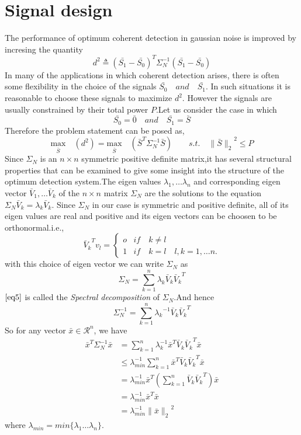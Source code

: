 \documentclass[12pt]{report}
\begin{document}
\section{Signal design}
    The performance of optimum coherent detection in gaussian noise is improved by incresing the quantity \[d^2\triangleq (\bar{S_1}-\bar{S_0})^T\varSigma_{N}^{-1}(\bar{S_1}-\bar{S_0})\]In many of the applications in which coherent detection arises, there is often some flexibility in the choice of the signals $\bar{S_0}\quad and\quad\bar{S_1}$. In such situations it is reasonable to choose these signals to maximize $d^2$. However the signals are usually constrained by their total power $P$.Let us consider the case in which\[\bar{S_0}=\bar{0}\quad and\quad\bar{S_1}=\bar{S}\] Therefore the problem statement can be posed as,
\begin{equation*}
\underset{\bar{S}}{\mathrm{max}}\quad (d^2)= \underset{\bar{S}}{\mathrm{max}}\quad (\bar{S}^T\varSigma_{N}^{-1}\bar{S})\qquad s.t.\quad {\parallel\bar{S}\parallel_2}^2\leq {P} 
\end{equation*}
Since $\varSigma_N$ is an $n\times n$ symmetric positive definite matrix,it has several structural properties that can be examined to give some insight into the structure of the optimum detection system.The eigen values $\lambda_1,\dots \lambda_n$ and corresponding eigen vector $\bar{V}_1,\dots \bar{V}_k $ of the $n\times n$ matrix $\varSigma_N$ are the solutions to the equation $\varSigma_{N}\bar{V}_k=\lambda_k\bar{V}_k $. Since $\varSigma_{N}$ in our case is symmetric and positive definite, all of its eigen values are real and positive and its eigen vectors can be choosen to be orthonormal.i.e.,
\[{\bar{V}_k}^Tv_l=\begin{cases}
o &if\quad k\neq l\\1 &if\quad k=l\quad l,k=1,\dots n.
\end{cases}\]
with this choice of eigen vector we can write $\varSigma_{N}$ as
\begin{equation}
\label{eq5}\varSigma_{N}=\sum_{k=1}^{n}\lambda_k\bar{V}_k{\bar{V}_k}^T
\end{equation}
$\eqref{eq5}$ is called the \textit{Spectral decomposition} of $\varSigma_{N}$.And hence \[\varSigma_{N}^{-1}=\sum_{k=1}^{n}{\lambda_k}^{-1}\bar{V}_k{\bar{V}_k}^T\] So for any vector $\bar{x}\in \mathcal{R}^n$, we have
\begin{align*}
	\bar{x}^T\varSigma_{N}^{-1}\bar{x}&=\sum_{k=1}^{n}\lambda_k^{-1}\bar{x}^T\bar{V}_k{\bar{V}_k}^T\bar{x}\\&\leq \lambda_{min}^{-1}\sum_{k=1}^{n}\bar{x}^T\bar{V}_k{\bar{V}_k}^T\bar{x}\\&= \lambda_{min}^{-1}\bar{x}^T(\sum_{k=1}^{n}\bar{V}_k{\bar{V}_k}^T)\bar{x}\\&= \lambda_{min}^{-1}\bar{x}^T\bar{x}\\&= \lambda_{min}^{-1}{\parallel\bar{x}\parallel_2}^2
\end{align*} where $\lambda_{min}=min\lbrace\lambda_1\dots \lambda_n \rbrace$. 
\end{document}
